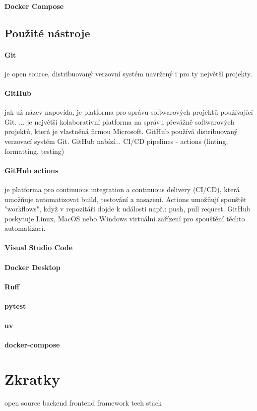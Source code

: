 \documentclass[12pt, a4paper]{article}
\begin{document}
\paragraph{Docker Compose}
\subsection{Použité nástroje}
\paragraph{Git}
je open source, distribuovaný verzovní systém navržený i pro ty největší projekty.
\paragraph{GitHub}
jak už název napovída, je platforma pro správu softwarových projektů používající Git.  ... je největší kolaborativní platforma na správu převážně softwarových projektů, která je vlastněná firmou Microsoft. GitHub používá distribuovaný verzovací systém Git. GitHub nabízí... CI/CD pipelines - actions (linting, formatting, testing)
\paragraph{GitHub actions}je platforma pro continuous integration a continuous delivery (CI/CD), která umožňuje automatizovat build, testování a nasazení. Actions umožňují spouštět "workflows", když v repozitáři dojde k události např.: push, pull request. GitHub poskytuje Linux, MacOS nebo Windows virtuální zařízení pro spouštění těchto automatizací.
\paragraph{Visual Studio Code}
\paragraph{Docker Desktop}
\paragraph{Ruff}
\paragraph{pytest}
\paragraph{uv}
\paragraph{docker-compose}
\section{Zkratky}
open source
backend
frontend
framework
tech stack
\clearpage
\clearpage
\printbibliography
\end{document}
